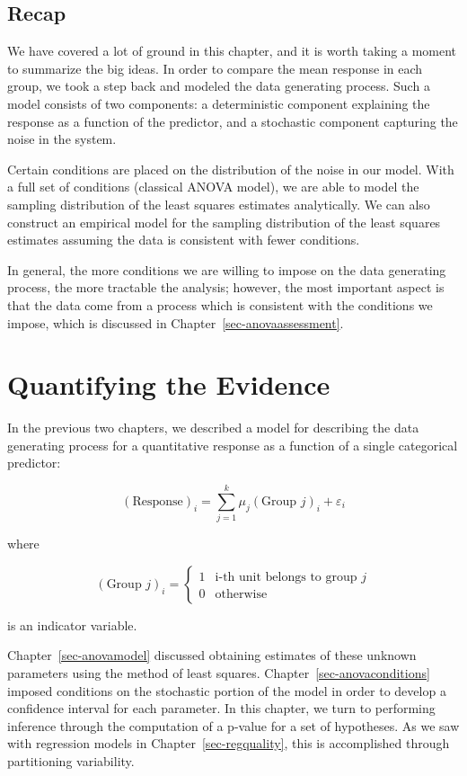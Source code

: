 \documentclass[
  letterpaper,
  DIV=11,
  numbers=noendperiod]{scrreprt}
\theoremstyle{definition}
\theoremstyle{definition}
\theoremstyle{plain}
\theoremstyle{remark}
\begin{document}
\section{Recap}\label{recap-1}

We have covered a lot of ground in this chapter, and it is worth taking
a moment to summarize the big ideas. In order to compare the mean
response in each group, we took a step back and modeled the data
generating process. Such a model consists of two components: a
deterministic component explaining the response as a function of the
predictor, and a stochastic component capturing the noise in the system.

Certain conditions are placed on the distribution of the noise in our
model. With a full set of conditions (classical ANOVA model), we are
able to model the sampling distribution of the least squares estimates
analytically. We can also construct an empirical model for the sampling
distribution of the least squares estimates assuming the data is
consistent with fewer conditions.

In general, the more conditions we are willing to impose on the data
generating process, the more tractable the analysis; however, the most
important aspect is that the data come from a process which is
consistent with the conditions we impose, which is discussed in
Chapter~\ref{sec-anovaassessment}.

\chapter{Quantifying the Evidence}\label{sec-anovateststat}

In the previous two chapters, we described a model for describing the
data generating process for a quantitative response as a function of a
single categorical predictor:

\[(\text{Response})_i = \sum_{j = 1}^{k} \mu_j (\text{Group } j)_i + \varepsilon_i\]

where

\[(\text{Group } j)_i = \begin{cases} 1 & \text{i-th unit belongs to group } j \\ 0 & \text{otherwise} \end{cases}\]

is an indicator variable.

Chapter~\ref{sec-anovamodel} discussed obtaining estimates of these
unknown parameters using the method of least squares.
Chapter~\ref{sec-anovaconditions} imposed conditions on the stochastic
portion of the model in order to develop a confidence interval for each
parameter. In this chapter, we turn to performing inference through the
computation of a p-value for a set of hypotheses. As we saw with
regression models in Chapter~\ref{sec-regquality}, this is accomplished
through partitioning variability.
\end{document}
